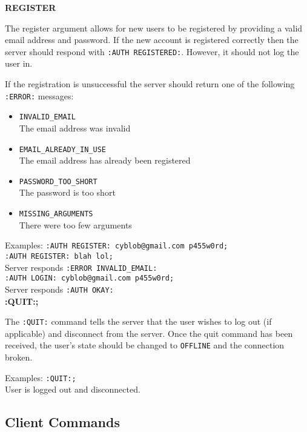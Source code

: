 {\bf REGISTER}

The register argument allows for new users to be registered by providing a valid email address and password. If the new account is registered correctly then the server should respond with \texttt{:AUTH REGISTERED:}. However, it should not log the user in.

If the registration is unsuccessful the server should return one of the following \texttt{:ERROR:} messages:

\begin{itemize}

\item{\texttt{INVALID\_EMAIL} \\
The email address was invalid}

\item{\texttt{EMAIL\_ALREADY\_IN\_USE} \\
The email address has already been registered}

\item{\texttt{PASSWORD\_TOO\_SHORT} \\
The password is too short}

\item{\texttt{MISSING\_ARGUMENTS}	\\
There were too few arguments}

\end{itemize}

Examples:
\texttt{:AUTH REGISTER: cyblob@gmail.com p455w0rd;} \\
\texttt{:AUTH REGISTER: blah lol;} \\
Server responds \texttt{:ERROR INVALID\_EMAIL:} \\
\texttt{:AUTH LOGIN: cyblob@gmail.com p455w0rd;}\\
Server responds \texttt{:AUTH OKAY:} \\

{\bf :QUIT:;}

The \texttt{:QUIT:} command tells the server that the user wishes to log out (if applicable) and disconnect from the server. Once the quit command has been received, the user's state should be changed to \texttt{OFFLINE} and the connection broken.

Examples:
\texttt{:QUIT:;} \\
User is logged out and disconnected.

\subsection{Client Commands}

